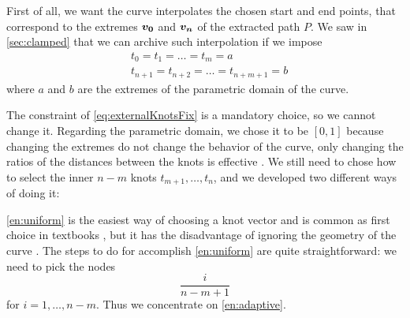 \documentclass[dissertation.tex]{subfiles}
\begin{document}
First of all, we want
the curve interpolates
the chosen start and end points, that correspond to the extremes
$\boldsymbol{v_0}$ and $\boldsymbol{v_n}$ of the extracted path $P$. We saw in
\cref{sec:clamped} that we can archive such interpolation if we impose
\begin{equation}\label{eq:externalKnotsFix}
  \begin{split}
    &t_0 = t_1 = \dots = t_{m} = a\\
    &t_{n+1} = t_{n+2} = \dots = t_{n+m+1} = b
  \end{split}
\end{equation}
where $a$ and $b$ are the extremes of the parametric domain of
the curve.

The constraint of \cref{eq:externalKnotsFix} is a mandatory
choice, so we cannot change it. Regarding the parametric domain, we
chose it to be $[0,1]$ because changing the extremes do not change
the behavior of the curve, only changing the ratios of the distances
between the knots is effective \cite{farin}. We still need to chose how to select 
the inner $n-m$ knots $t_{m+1},\dots,t_n$, and we developed two different
ways of doing it:

\cref{en:uniform} is the easiest way of choosing a knot vector
and is common as first choice in textbooks \cite{farin}\cite{docarmo},
but it has the disadvantage of ignoring the geometry of the curve
\cite{farin}. The steps to do for accomplish \cref{en:uniform} are quite
straightforward: we need to pick the nodes
\begin{equation*}
  \frac{i}{n-m+1}
\end{equation*}
for $i=1,\dots,n-m$. Thus we concentrate on \cref{en:adaptive}.
\end{document}
